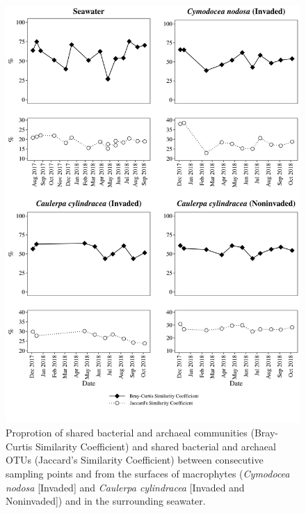 \documentclass[12pt,]{article}
\begin{document}
\begin{figure}[H]

{\centering \includegraphics[width=0.85\linewidth]{../results/figures/seasonal_shared} 

}

\caption{Proprotion of shared bacterial and archaeal communities (Bray-Curtis Similarity Coefficient) and shared bacterial and archaeal OTUs (Jaccard's Similarity Coefficient) between consecutive sampling points and from the surfaces of macrophytes (\textit{Cymodocea nodosa} [Invaded] and \textit{Caulerpa cylindracea} [Invaded and Noninvaded]) and in the surrounding seawater.\label{shared}}\label{fig:unnamed-chunk-4}
\end{figure}
\end{document}
